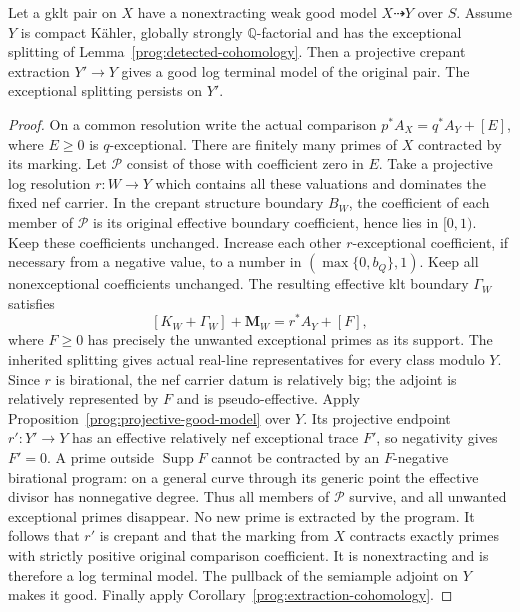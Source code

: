 \begin{lemma}
\label{prog:weak-to-terminal}
Let a gklt pair on $X$ have a nonextracting weak good model
$X\dashrightarrow Y$ over $S$. Assume $Y$ is compact K\"ahler,
globally strongly $\mathbb Q$-factorial and has the exceptional
splitting of Lemma~\ref{prog:detected-cohomology}. Then a projective
crepant extraction $Y'\to Y$ gives a good log terminal model of the
original pair. The exceptional splitting persists on $Y'$.
\end{lemma}
\begin{proof}
On a common resolution write the actual comparison
$p^*A_X=q^*A_Y+[E]$, where $E\geq0$ is $q$-exceptional.
There are finitely many primes of $X$ contracted by its marking.
Let $\mathcal P$ consist of those with coefficient zero in $E$.
Take a projective log resolution $r:W\to Y$ which contains all
these valuations and dominates the fixed nef carrier. In the crepant
structure boundary $B_W$, the coefficient of each member of
$\mathcal P$ is its original effective boundary coefficient, hence
lies in $[0,1)$. Keep these coefficients unchanged. Increase each
other $r$-exceptional coefficient, if necessary from a negative
value, to a number in $(\max\{0,b_Q\},1)$. Keep all nonexceptional
coefficients unchanged. The resulting effective klt boundary
$\Gamma_W$ satisfies
\[
 [K_W+\Gamma_W]+\mathbf M_W=r^*A_Y+[F],
\]
where $F\geq0$ has precisely the unwanted exceptional primes as its
support. The inherited splitting gives actual real-line representatives
for every class modulo $Y$. Since $r$ is birational, the nef carrier
datum is relatively big; the adjoint is relatively represented by
$F$ and is pseudo-effective. Apply
Proposition~\ref{prog:projective-good-model} over $Y$.
Its projective endpoint $r':Y'\to Y$ has an effective relatively nef
exceptional trace $F'$, so negativity gives $F'=0$. A prime outside
$\operatorname{Supp}F$ cannot be contracted by an $F$-negative
birational program: on a general curve through its generic point the
effective divisor has nonnegative degree. Thus all members of
$\mathcal P$ survive, and all unwanted exceptional primes disappear.
No new prime is extracted by the program. It follows that $r'$ is
crepant and that the marking from $X$ contracts exactly primes with
strictly positive original comparison coefficient. It is nonextracting
and is therefore a log terminal model. The pullback of the semiample
adjoint on $Y$ makes it good. Finally apply
Corollary~\ref{prog:extraction-cohomology}.
\end{proof}

